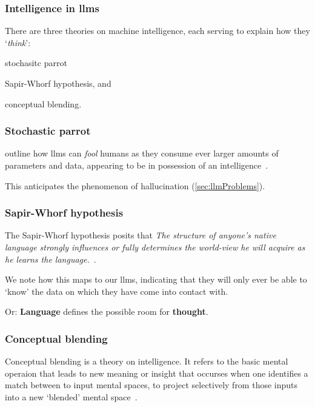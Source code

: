 
\subsubsection{Intelligence in \acrshort{llms}}\label{sec:llmIntelligence}

There are three theories on machine intelligence, each serving to
explain how they `\textit{think}': \begin{inparaenum}
    \item stochasitc parrot
    \item Sapir-Whorf hypothesis,
    and
    \item conceptual blending.
\end{inparaenum}

\subsubsection*{Stochastic parrot}\label{sec:llmParrot}

\citeauthor{parrot} outline how \acrshort{llms} can \textit{fool} humans as they
consume ever larger amounts of parameters and data, appearing to be in possession of an
intelligence~\cite[610-611]{parrot}.

This anticipates the phenomenon of hallucination (\cref{sec:llmProblems}).

\subsubsection*{Sapir-Whorf hypothesis}

The Sapir-Whorf hypothesis posits that  \textit{The structure of anyone’s native
    language strongly influences or fully determines the world-view he will acquire
    as he learns the language.}~\cite[128]{sapirWhorf}.

We note how this maps to our \acrshort{llms}, indicating that they will only ever
be able to `know' the data on which they have come into contact with.

Or: \textbf{Language} defines the possible room for \textbf{thought}.


\subsubsection*{Conceptual blending}

Conceptual blending is a theory on intelligence. It refers to the basic mental
operaion that leads to new meaning or insight that occurses when one identifies
a match between to input mental spaces, to project selectively from those inputs
into a new `blended' mental space~\cite[57-58]{conceptBlending}.

